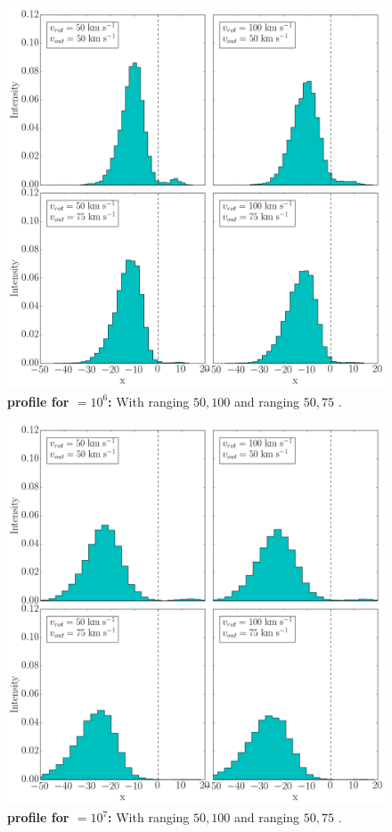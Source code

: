 \documentclass{latex/emulateapj}
\begin{document}
\begin{figure}[h!]
	\begin{center}
		\includegraphics[width=1\textwidth]{./figures/appendix/2_tau10E6_phi83-90}
	\end{center}
	\caption{\textbf{\lya profile for \tauh$=10^6$:} With \vrot ranging $50,100$ \kms and \vout ranging $50,75$ \kms.
		\label{fig:2_tau10E6_phi83-90}}
\end{figure}

\begin{figure}[h!]
	\begin{center}
		\includegraphics[width=1\textwidth]{./figures/appendix/2_tau10E7_phi83-90}
	\end{center}
	\caption{\textbf{\lya profile for \tauh$=10^7$:} With \vrot ranging $50,100$ \kms and \vout ranging $50,75$ \kms.
		\label{fig:2_tau10E7_phi83-90}}
\end{figure}
\end{document}
